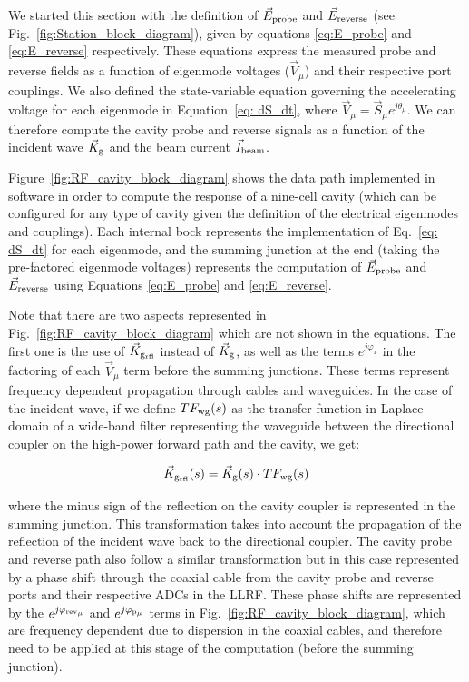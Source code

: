 \documentclass[a4paper,12pt]{article}
\begin{document}
We started this section with the definition of $\vec E_{\rm probe}$ and $\vec E_{\rm reverse}$ (see Fig.~\ref{fig:Station_block_diagram}), given by equations \ref{eq:E_probe} and \ref{eq:E_reverse} respectively. These equations express the measured probe and reverse fields as a function of eigenmode voltages ($\vec V_\mu$) and their respective port couplings. We also defined the state-variable equation governing the accelerating voltage for each eigenmode in Equation~\ref{eq: dS_dt}, where $\vec{V}_{\mu} = \vec{S}_{\mu}e^{j\theta_{\mu}}$. We can therefore compute the cavity probe and reverse signals as a function of the incident wave $\vec K_{\rm g}$ and the beam current $\vec I_{\rm beam}$.

Figure~\ref{fig:RF_cavity_block_diagram} shows the data path implemented in software in order to compute the response of a nine-cell cavity (which can be configured for any type of cavity given the definition of the electrical eigenmodes and couplings). Each internal bock represents the implementation of Eq.~\ref{eq: dS_dt} for each eigenmode, and the summing junction at the end (taking the pre-factored eigenmode voltages) represents the computation of $\vec E_{\rm probe}$ and $\vec E_{\rm reverse}$ using Equations \ref{eq:E_probe} and \ref{eq:E_reverse}.

Note that there are two aspects represented in Fig.~\ref{fig:RF_cavity_block_diagram} which are not shown in the equations. The first one is the use of $\vec K_{\rm g_{rfl}}$ instead of $\vec K_{\rm g}$, as well as the terms $e^{j\varphi_{x}}$ in the factoring of each $\vec V_\mu$ term before the summing junctions. These terms represent frequency dependent propagation through cables and waveguides. In the case of the incident wave, if we define $TF_{\rm wg}(s)$ as the transfer function in Laplace domain of a wide-band filter representing the waveguide between the directional coupler on the high-power forward path and the cavity, we get:

\begin{equation}
 \vec K_{\rm g_{rfl}}(s) = \vec K_{\rm g}(s) \cdot TF_{\rm wg}(s)
\end{equation}

\noindent where the minus sign of the reflection on the cavity coupler is represented in the summing junction. This transformation takes into account the propagation of the reflection of the incident wave back to the directional coupler.
The cavity probe and reverse path also follow a similar transformation but in this case represented by a phase shift through the coaxial cable from the cavity probe and reverse ports and their respective ADCs in the LLRF. These phase shifts are represented by the $e^{j\varphi_{\rm rev_{\mu}}}$ and $e^{j\varphi_{\rm p_{\mu}}}$ terms in Fig.~\ref{fig:RF_cavity_block_diagram}, which are frequency dependent due to dispersion in the coaxial cables, and therefore need to be applied at this stage of the computation (before the summing junction).
\end{document}
